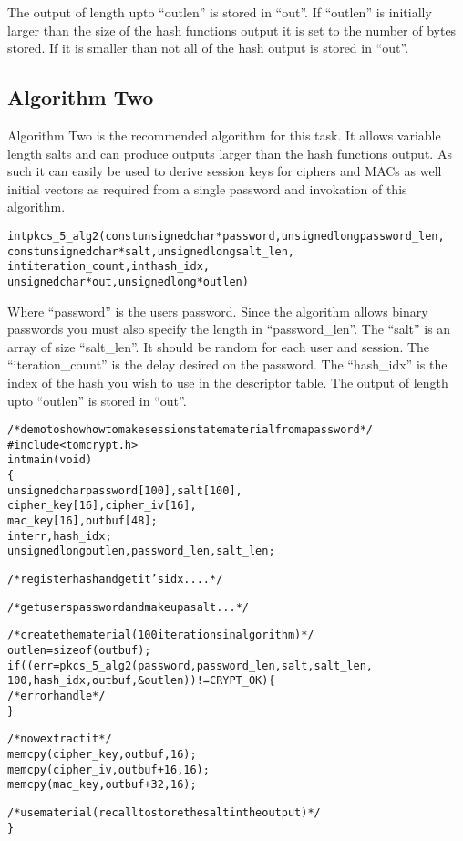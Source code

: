 \documentclass[a4paper]{book}
\begin{document}
The output of length upto ``outlen'' is stored in ``out''.  If ``outlen'' is initially larger than the size of the hash functions output
it is set to the number of bytes stored.  If it is smaller than not all of the hash output is stored in ``out''.

\subsection{Algorithm Two}

Algorithm Two is the recommended algorithm for this task.  It allows variable length salts and can produce outputs larger than the 
hash functions output.  As such it can easily be used to derive session keys for ciphers and MACs as well initial vectors as required
from a single password and invokation of this algorithm.

\begin{alltt}
int pkcs_5_alg2(const unsigned char *password, unsigned long password_len, 
                const unsigned char *salt,     unsigned long salt_len,
                int iteration_count,           int hash_idx,
                unsigned char *out,            unsigned long *outlen)
\end{alltt}
Where ``password'' is the users password.  Since the algorithm allows binary passwords you must also specify the length in ``password\_len''.  
The ``salt'' is an array of size ``salt\_len''.  It should be random for each user and session.  The ``iteration\_count'' is the delay desired
on the password.  The ``hash\_idx'' is the index of the hash you wish to use in the descriptor table.   The output of length upto 
``outlen'' is stored in ``out''.

\begin{alltt}
/* demo to show how to make session state material from a password */
#include <tomcrypt.h>
int main(void)
\{
    unsigned char password[100], salt[100],
                  cipher_key[16], cipher_iv[16],
                  mac_key[16], outbuf[48];
    int           err, hash_idx;
    unsigned long outlen, password_len, salt_len;

    /* register hash and get it's idx .... */

    /* get users password and make up a salt ... */

    /* create the material (100 iterations in algorithm) */
    outlen = sizeof(outbuf);
    if ((err = pkcs_5_alg2(password, password_len, salt, salt_len, 
                           100, hash_idx, outbuf, &outlen)) != CRYPT_OK) \{
       /* error handle */
    \}

    /* now extract it */
    memcpy(cipher_key, outbuf, 16);
    memcpy(cipher_iv,  outbuf+16, 16);
    memcpy(mac_key,    outbuf+32, 16);

    /* use material (recall to store the salt in the output) */
\}
\end{alltt}
\end{document}
